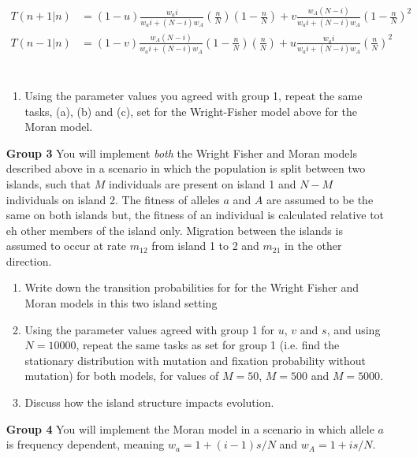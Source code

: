 \documentclass[12pt]{article}
\begin{document}
\begin{enumerate}
\begin{eqnarray*}
T(n+1|n)&=(1-u)\frac{w_a i}{w_a i+(N-i)w_A}\left(\frac{n}{N}\right)\left(1-\frac{n}{N}\right)+v\frac{w_A (N-i)}{w_a i+(N-i)w_A}\left(1-\frac{n}{N}\right)^2\\
T(n-1|n)&=(1-v)\frac{w_A (N-i)}{w_a i+(N-i)w_A}\left(1-\frac{n}{N}\right)\left(\frac{n}{N}\right)+u\frac{w_a i}{w_a i+(N-i)w_A}\left(\frac{n}{N}\right)^2\\
\end{eqnarray*}
\\

\begin{enumerate}
\item Using the parameter values you agreed with group 1, repeat the same tasks, (a), (b) and (c), set for the Wright-Fisher model above for the Moran model.
\end{enumerate}

\item[\bf Group 3] 
You will implement \emph{both} the Wright Fisher and Moran models described above in a scenario in which the population is split between two islands, such that $M$ individuals are present on island 1 and $N-M$ individuals on island 2. The fitness of alleles $a$ and $A$ are assumed to be the same on both islands but, the fitness of an individual is calculated relative tot eh other members of the island only. Migration between the islands is assumed to occur at rate $m_{12}$ from island 1 to 2 and $m_{21}$ in the other direction.

\begin{enumerate}
\item Write down the transition probabilities for for the Wright Fisher and Moran models in this two island setting
\item Using the parameter values agreed with group 1 for $u$, $v$ and $s$, and using $N=10000$, repeat the same tasks as set for group 1 (i.e. find the stationary distribution with mutation and fixation probability without mutation) for both models, for values of $M=50$, $M=500$ and $M=5000$. 
\item Discuss how the island structure impacts evolution.
\end{enumerate}

\item[\bf Group 4] 
You will implement the Moran model in a scenario in which allele $a$ is frequency dependent, meaning $w_a=1+(i-1)s/N$ and $w_A=1+is/N$.



\end{enumerate}
\end{document}
